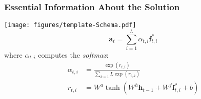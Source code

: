   
  
  
  \begin{frame}
    \frametitle{Essential Information About the Solution}
    \centering\texttt{[image: figures/template-Schema.pdf]}
    \begin{equation}
        \mathbf{a}_t = \sum_{i=1}^{L}\alpha_{t,i}\mathbf{f}_{t,i}^{*}
    \end{equation}
    where $\alpha_{t,i}$ computes the \emph{softmax}:
    \begin{align}
        \alpha_{t,i} &= \frac{\exp(r_{t,i})}{\sum_{k=1}{L}\exp(r_{t,k})} 
        \\
        r_{t,i} &= W^a \tanh\left( W^h \mathbf{h}_{t-1} + W^f\mathbf{f}_{t,i}^{*} + b \right)
    \end{align}
  \end{frame}
  
